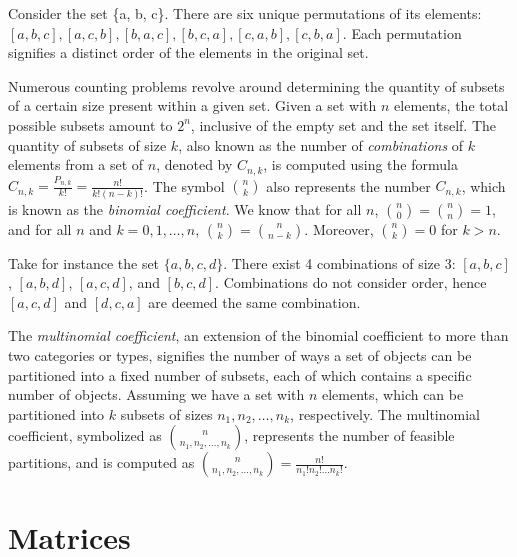 \begin{example}
Consider the set \{a, b, c\}. There are six unique permutations of its elements: $[a, b, c], [a, c, b], [b, a, c], [b, c, a], [c, a, b], [c, b, a]$. Each permutation signifies a distinct order of the elements in the original set.
\end{example}

Numerous counting problems revolve around determining the quantity of subsets of a certain size present within a given set. Given a set with $n$ elements, the total possible subsets amount to $2^n$, inclusive of the empty set and the set itself. The quantity of subsets of size $k$, also known as the number of \emph{combinations} of $k$ elements from a set of $n$, denoted by $C_{n,k}$, is computed using the formula $C_{n,k}=\frac{P_{n,k}}{k!}=\frac{n!}{k!\left(n-k\right)!}$. The symbol ${n \choose k}$ also represents the number $C_{n,k}$, which is known as the \emph{binomial coefficient}. We know that for all $n$, ${n \choose 0}={n \choose n}=1$, and for all $n$ and $k=0,1,\ldots,n$, ${n \choose k}={n \choose n-k}$. Moreover, ${n \choose k} = 0$ for $k>n$.

\begin{example}
Take for instance the set $\{a, b, c, d \}$. There exist 4 combinations of size 3: $[a, b, c]$, $[a, b, d]$, $[a, c, d]$, and $[b, c, d]$. Combinations do not consider order, hence $[a, c, d]$ and $[d, c, a]$ are deemed the same combination.
\end{example}

The \emph{multinomial coefficient}, an extension of the binomial coefficient to more than two categories or types, signifies the number of ways a set of objects can be partitioned into a fixed number of subsets, each of which contains a specific number of objects. Assuming we have a set with $n$ elements, which can be partitioned into $k$ subsets of sizes $n_1, n_2, \ldots, n_k$, respectively. The multinomial coefficient, symbolized as ${n \choose n_{1},n_{2},\ldots,n_{k}}$, represents the number of feasible partitions, and is computed as ${n \choose n_{1},n_{2},\ldots,n_{k}} = \frac{n!}{n_{1}!n_{2}!\ldots n_{k}!}$.

%
%

\section{Matrices}

